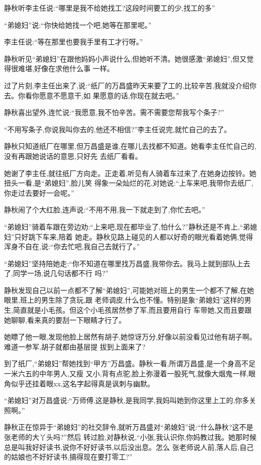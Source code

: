 ﻿\documentclass[12pt]{article}
\begin{document}
静秋听李主任说:``哪里是我不给她找工?这段时间要工的少,找工的多\myrule ''

``弟媳妇''说:``你快给她找一个吧,她等在那里呢。''

李主任说:``等在那里也要我手里有工才行呀。''

静秋听见``弟媳妇''在跟他妈妈小声说什么,但她听不清。她很感激``弟媳妇'',但又觉得很难堪,好像在求他什么事
一样。

过了片刻,李主任出来了,说:``纸厂的万昌盛昨天来要了工的,比较辛苦,我就没介绍你去。你看你愿意不愿意干,如
果愿意的话,你现在就去吧。''

静秋喜出望外,连忙说:``我愿意,我不怕辛苦。需不需要您帮我写个条子?''

``不用写条子,你说我叫你去的,他还不相信?''李主任说完,就忙自己的去了。

静秋只知道纸厂在哪里,但万昌盛是谁,在哪儿去找都不知道。她看李主任忙自己的,没有再跟她说话的意思,只好先
去纸厂看看。

她谢了李主任,就往纸厂方向走。正走着,听见有人骑着车过来了,在她身边按铃。她扭头一看,是``弟媳妇'',脸儿笑
得象一朵灿烂的花,对她说:``上车来吧,我带你去纸厂,你走过去要好一会呢。''

静秋闹了个大红脸,连声说:``不用不用,我一下就走到了,你忙去吧。''

``弟媳妇''骑着车跟在旁边劝:``上来吧,现在都毕业了,怕什么?''静秋还是不肯上,``弟媳妇''只好跳下车来,陪着
她走。静秋见路上碰见的人都以好奇的眼光看着她俩,觉得浑身不自在,说:``你\myrule 去忙吧,我自己去就行了。''

``弟媳妇''坚持陪她走:``你不知道在哪里找万昌盛,我带你去。我马上就到部队上去了,同学一场,说几句话都不行
吗?''

静秋发现自己以前一点都不了解``弟媳妇'',可能她对班上的男生一个都不了解,在她眼里,班上的男生除了贪玩,跟
老师调皮,什么也不懂。特别是象``弟媳妇''这样的男生,简直就是小毛孩。但这个小毛孩居然参了军,而且要用自行
车带她,又而且要跟她聊聊,看来真的要刮一下眼睛才行了。

她瞟了他一眼,发现他脸上居然有胡子,她惊讶万分,好像以前没看见过他有胡子啊。难道一参军,胡子就都由基层提
拔到上面来了?

到了纸厂,``弟媳妇''帮她找到``甲方''万昌盛。静秋一看,所谓万昌盛,是一个身高不足一米六五的中年男人,又瘦
又小,背有点驼,脸上弥漫着一股死气,就像大烟鬼一样,眼角似乎还挂着眼xx,这名字起得真是讽刺与幽默。

``弟媳妇''对万昌盛说:``万师傅,这是静秋,是我同学,我妈叫她到你这里上工的,你多关照啊。''

静秋正在惊异于``弟媳妇''的社交辞令,就听万昌盛对``弟媳妇''说:``什么静秋?这不是张老师的大丫头吗?''然后
转过脸,对静秋说,``小张,我认识你,你妈教过我。她那时候总是叫我好好读书,说你不好好读书,以后没出息。怎么
张老师说人前,落人后,自己的姑娘也不好好读书,搞得现在要打零工?''
\end{document}
